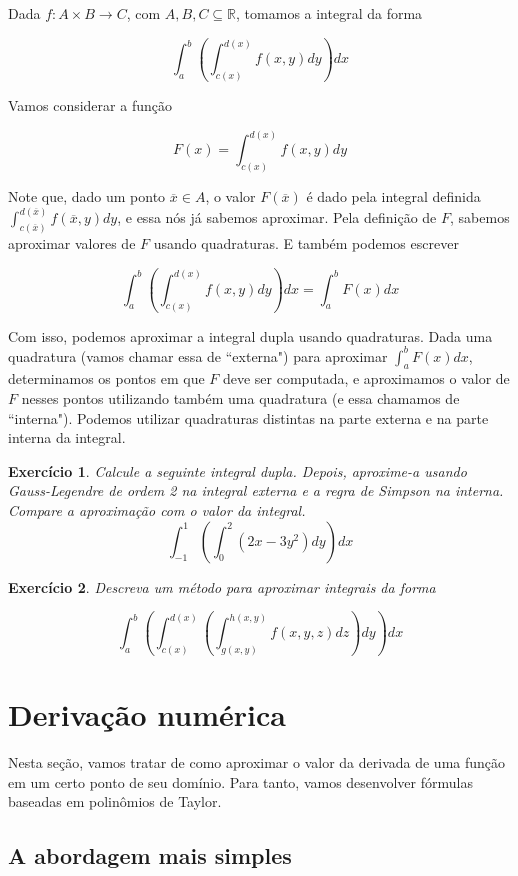 \documentclass[]{article}
\newtheorem{exercicio}{Exercício}
\numberwithin{equation}{section}
\begin{document}
Dada $f : A \times B \to C$, com $A, B, C \subseteq \mathbb{R}$, tomamos a integral da forma

$$
\int_{a}^{b} \left(\int_{c(x)}^{d(x)} f(x, y) dy\right) dx
$$

Vamos considerar a função

$$
F(x) = \int_{c(x)}^{d(x)} f(x, y) dy
$$

Note que, dado um ponto $\overline{x} \in A$, o valor $F(\overline{x})$ é dado pela integral definida $\int_{c(\overline{x})}^{d(\overline{x})} f(\overline{x}, y) dy$, e essa nós já sabemos aproximar. Pela definição de $F$, sabemos aproximar valores de $F$ usando quadraturas. E também podemos escrever

$$
\int_{a}^{b} \left(\int_{c(x)}^{d(x)} f(x, y) dy\right) dx = \int_{a}^{b} F(x) dx
$$

Com isso, podemos aproximar a integral dupla usando quadraturas. Dada uma quadratura (vamos chamar essa de ``externa") para aproximar $\int_{a}^{b} F(x) dx$,  determinamos os pontos em que $F$ deve ser computada, e aproximamos o valor de $F$ nesses pontos utilizando também uma quadratura (e essa chamamos de ``interna"). Podemos utilizar quadraturas distintas na parte externa e na parte interna da integral.

\begin{exercicio}
	Calcule a seguinte integral dupla. Depois, aproxime-a usando Gauss-Legendre de ordem 2 na integral externa e a regra de Simpson na interna. Compare a aproximação com o valor da integral. $$\int_{-1}^{1} \left(\int_{0}^{2} (2x - 3y^2) dy\right) dx$$
\end{exercicio}

\begin{exercicio}
	Descreva um método para aproximar integrais da forma

	$$
	\int_{a}^{b} \left(\int_{c(x)}^{d(x)} \left(\int_{g(x, y)}^{h(x, y)} f(x, y, z) dz\right) dy\right) dx
	$$
\end{exercicio}

\section{Derivação numérica}

Nesta seção, vamos tratar de como aproximar o valor da derivada de uma função em um certo ponto de seu domínio. Para tanto, vamos desenvolver fórmulas baseadas em polinômios de Taylor.

\subsection{A abordagem mais simples}
\end{document}
